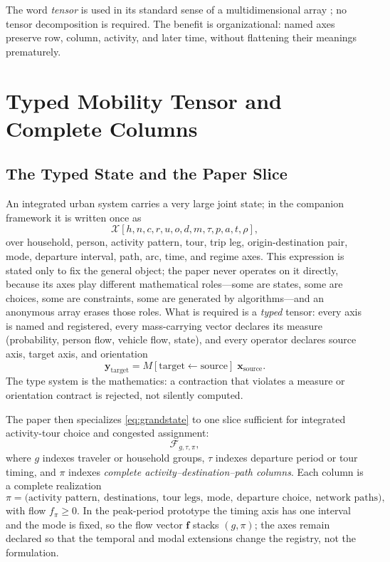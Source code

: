 \documentclass[10pt]{article}
\newcommand{\vect}[1]{\boldsymbol{#1}}
\begin{document}
The word \emph{tensor} is used in its standard sense of a multidimensional array \parencite{kolda2009}; no tensor decomposition is required. The benefit is organizational: named axes preserve row, column, activity, and later time, without flattening their meanings prematurely.

\section{Typed Mobility Tensor and Complete Columns}

\subsection{The Typed State and the Paper Slice}
An integrated urban system carries a very large joint state; in the companion framework it is written once as
\begin{equation}
\mathcal X[h,n,c,r,u,o,d,m,\tau,p,a,t,\rho],
\label{eq:grandstate}
\end{equation}
over household, person, activity pattern, tour, trip leg, origin-destination pair, mode, departure interval, path, arc, time, and regime axes. This expression is stated only to fix the general object; the paper never operates on it directly, because its axes play different mathematical roles---some are states, some are choices, some are constraints, some are generated by algorithms---and an anonymous array erases those roles. What is required is a \emph{typed} tensor: every axis is named and registered, every mass-carrying vector declares its measure (probability, person flow, vehicle flow, state), and every operator declares source axis, target axis, and orientation
\begin{equation}
\vect y_{\text{target}} = M[\text{target}\leftarrow\text{source}]\;\vect x_{\text{source}}.
\label{eq:orientation}
\end{equation}
The type system is the mathematics: a contraction that violates a measure or orientation contract is rejected, not silently computed.

The paper then specializes \eqref{eq:grandstate} to one slice sufficient for integrated activity-tour choice and congested assignment:
\begin{equation}
\mathcal F_{g,\tau,\pi},
\label{eq:slice}
\end{equation}
where $g$ indexes traveler or household groups, $\tau$ indexes departure period or tour timing, and $\pi$ indexes \emph{complete activity--destination--path columns}. Each column is a complete realization
\begin{equation}
\pi=\big(\text{activity pattern},\ \text{destinations},\ \text{tour legs},\ \text{mode},\ \text{departure choice},\ \text{network paths}\big),
\label{eq:column}
\end{equation}
with flow $f_{\pi}\geq 0$. In the peak-period prototype the timing axis has one interval and the mode is fixed, so the flow vector $\vect f$ stacks $(g,\pi)$; the axes remain declared so that the temporal and modal extensions change the registry, not the formulation.
\end{document}
